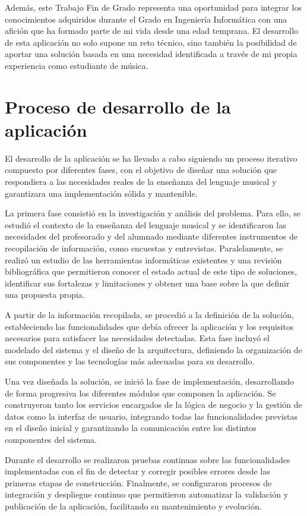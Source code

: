 Además, este Trabajo Fin de Grado representa una oportunidad para integrar los conocimientos adquiridos durante el Grado en Ingeniería Informática con una afición que ha formado parte de mi vida desde una edad temprana. El desarrollo de esta aplicación no solo supone un reto técnico, sino también la posibilidad de aportar una solución basada en una necesidad identificada a través de mi propia experiencia como estudiante de música.

\section{Proceso de desarrollo de la aplicación}

El desarrollo de la aplicación se ha llevado a cabo siguiendo un proceso iterativo \cite{Pressman2010} compuesto por diferentes fases, con el objetivo de diseñar una solución que respondiera a las necesidades reales de la enseñanza del lenguaje musical y garantizara una implementación sólida y mantenible.

La primera fase consistió en la investigación y análisis del problema. Para ello, se estudió el contexto de la enseñanza del lenguaje musical y se identificaron las necesidades del profesorado y del alumnado mediante diferentes instrumentos de recopilación de información, como encuestas y entrevistas. Paralelamente, se realizó un estudio de las herramientas informáticas existentes y una revisión bibliográfica que permitieron conocer el estado actual de este tipo de soluciones, identificar sus fortalezas y limitaciones y obtener una base sobre la que definir una propuesta propia.

A partir de la información recopilada, se procedió a la definición de la solución, estableciendo las funcionalidades que debía ofrecer la aplicación y los requisitos necesarios para satisfacer las necesidades detectadas. Esta fase incluyó el modelado del sistema y el diseño de la arquitectura, definiendo la organización de sus componentes y las tecnologías más adecuadas para su desarrollo.

Una vez diseñada la solución, se inició la fase de implementación, desarrollando de forma progresiva los diferentes módulos que componen la aplicación. Se construyeron tanto los servicios encargados de la lógica de negocio y la gestión de datos como la interfaz de usuario, integrando todas las funcionalidades previstas en el diseño inicial y garantizando la comunicación entre los distintos componentes del sistema.

Durante el desarrollo se realizaron pruebas continuas sobre las funcionalidades implementadas con el fin de detectar y corregir posibles errores desde las primeras etapas de construcción. Finalmente, se configuraron procesos de integración y despliegue continuo que permitieron automatizar la validación y publicación de la aplicación, facilitando su mantenimiento y evolución.

